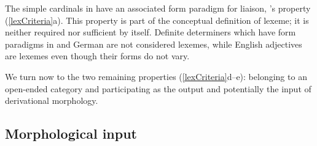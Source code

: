 \documentclass[output=paper]{langsci/langscibook}
\begin{document}
\begin{table}
\caption{Type of simple cardinal variation according to liaison}
\label{typesCardinals}
\end{table}

The simple cardinals  in  have an associated form paradigm  for liaison,  \citeauthor{Fradin03}'s property (\ref{lexCriteria}a). This property is part of the conceptual definition of lexeme; it is neither required nor sufficient by itself. Definite determiners which have form paradigms  in  and German are not considered lexemes, while English adjectives are lexemes even though their forms do not vary.

We turn now to the two remaining properties (\ref{lexCriteria}d--e): belonging to an open-ended category and participating as the output and potentially the input of derivational morphology.

\subsection{\textbf{Morphological input}}
\end{document}
